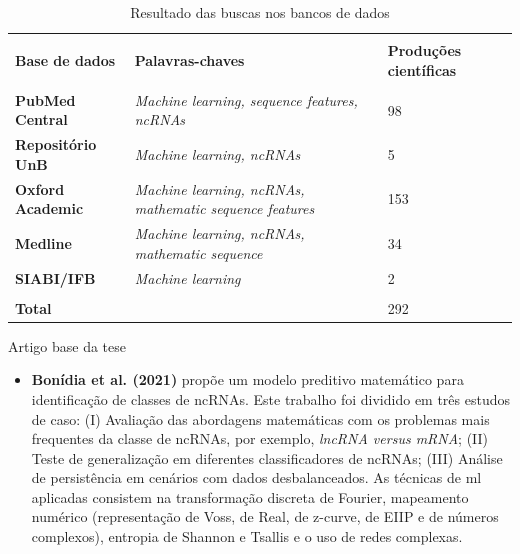 \documentclass{apresentacao-ifb}
\begin{document}
\begin{frame}{}
    \begin{table}[h!]
  \begin{center}
    \caption{Resultado das buscas nos bancos de dados}
    \label{tab:table2}
    \begin{tabular}{p{3cm} p{5cm} p{2cm}} %
      \hline \\
      \textbf{Base de dados} & \textbf{Palavras-chaves} & \textbf{Produções científicas} \\
      \hline \\
      \textbf{PubMed Central} & \textit{Machine learning, sequence features, ncRNAs} & 98\\
      \textbf{Repositório UnB} & \textit{Machine learning, ncRNAs} & 5 \\
      \textbf{Oxford Academic} & \textit{Machine learning, ncRNAs, mathematic sequence features} & 153\\
      \textbf{Medline} & \textit{Machine learning, ncRNAs, mathematic sequence} & 34\\
      \textbf{SIABI/IFB} & \textit{Machine learning} & 2\\ 
      \hline \\
      \textbf{Total} & & 292  
    \end{tabular}
  \end{center}
\end{table}
\end{frame}

\begin{frame}{Artigo base da tese}
    \begin{itemize}
       \item   \textbf{Bonídia et al. (2021)}  propõe um modelo preditivo matemático para identificação de classes de ncRNAs. Este trabalho foi dividido em três estudos de caso: (I) Avaliação das abordagens matemáticas com os problemas mais frequentes da classe de ncRNAs, por exemplo, \textit{lncRNA versus mRNA}; (II) Teste de generalização em diferentes classificadores de ncRNAs; (III) Análise de persistência em cenários com dados desbalanceados. As técnicas de \ac{ml} aplicadas consistem na transformação discreta de Fourier, mapeamento numérico (representação de Voss, de Real, de z-curve, de EIIP e de números complexos), entropia de Shannon e Tsallis e o uso de redes complexas. 
   \end{itemize}
\end{frame}
\end{document}
